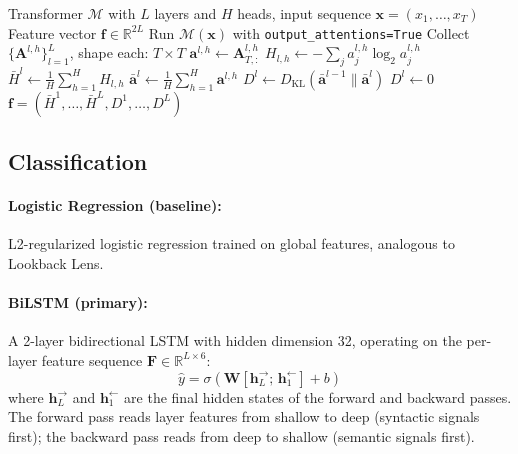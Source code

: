 \documentclass[11pt]{article}
\begin{document}
\begin{algorithm}[h]
\caption{AED Feature Extraction}
\label{alg:aed}
\begin{algorithmic}[1]
\Require Transformer $\mathcal{M}$ with $L$ layers and $H$ heads,
         input sequence $\mathbf{x} = (x_1, \ldots, x_T)$
\Ensure Feature vector $\mathbf{f} \in \mathbb{R}^{2L}$
\State Run $\mathcal{M}(\mathbf{x})$ with \texttt{output\_attentions=True}
\State Collect $\{\mathbf{A}^{l,h}\}_{l=1}^{L}$, \quad shape each: $T \times T$
    \State $\mathbf{a}^{l,h} \leftarrow \mathbf{A}^{l,h}_{T,:}$ 
    \State $H_{l,h} \leftarrow -\sum_j a^{l,h}_j \log_2 a^{l,h}_j$
  \EndFor
  \State $\bar{H}^l \leftarrow \frac{1}{H}\sum_{h=1}^{H} H_{l,h}$ 
  \State $\bar{\mathbf{a}}^l \leftarrow \frac{1}{H}\sum_{h=1}^{H} \mathbf{a}^{l,h}$ 
    \State $D^l \leftarrow D_{\text{KL}}(\bar{\mathbf{a}}^{l-1} \| \bar{\mathbf{a}}^l)$
  \Else
    \State $D^l \leftarrow 0$
  \EndIf
\EndFor
\State \Return $\mathbf{f} = (\bar{H}^1, \ldots, \bar{H}^L, D^1, \ldots, D^L)$
\end{algorithmic}
\end{algorithm}

\subsection{Classification}

\paragraph{Logistic Regression (baseline):}
L2-regularized logistic regression trained on global features, 
analogous to Lookback Lens.

\paragraph{BiLSTM (primary):}
A 2-layer bidirectional LSTM with hidden dimension 32, operating on the 
per-layer feature sequence $\mathbf{F} \in \mathbb{R}^{L \times 6}$:
\[
  \hat{y} = \sigma\!\left(\mathbf{W}[\mathbf{h}_L^{\rightarrow};\, \mathbf{h}_1^{\leftarrow}] + b\right)
\]
where $\mathbf{h}_L^{\rightarrow}$ and $\mathbf{h}_1^{\leftarrow}$ are the 
final hidden states of the forward and backward passes.
The forward pass reads layer features from shallow to deep (syntactic signals 
first); the backward pass reads from deep to shallow (semantic signals first).
\end{document}
